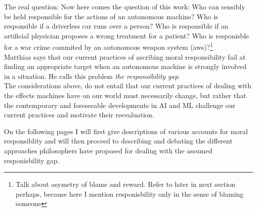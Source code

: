 \documentclass{article}
\begin{document}

The real question:
Now here comes the question of this work: Who can sensibly be held responsible for the
actions of an autonomous machine?
Who is responsible if a driverless car runs over a person? Who is responsible if
an artificial physician proposes a wrong treatment for a patient? Who is
responisble for a war crime commited by an autonomous weapon system
(\acrshort{aws})?\footnote{Talk about asymetry of blame and reward. Refer to
later in next section perhaps, because here I mention responisbility only in the
sense of blaming someone}\\

Matthias says that our current practices of ascribing moral responsibility
fail at finding an appropriate target when an autonomous machine is
strongly involved in a situation. He calls this problem \textit{the
responsibility gap}.\\

The considerations above, do not entail that our current practices of
dealing with the effects machines have on our world must necessarily change,
but rather that the contemporary and foreseeable developments in AI and ML
challenge our current practices and motivate their reevaluation.

On the following pages I will first give descriptions of various accounts for
moral responsiblity and will then proceed to describing and debating the
different approaches philosophers have proposed for dealing with the assumed
responisbility gap.
\end{document}

